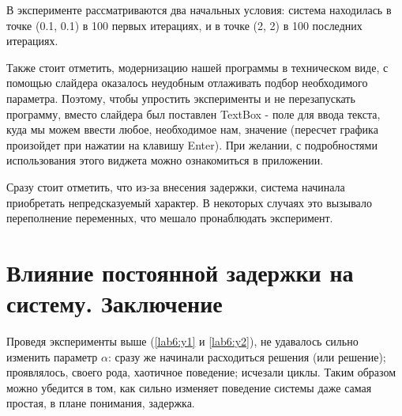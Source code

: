 В эксперименте рассматриваются два начальных условия: система находилась
в точке (0.1, 0.1) в 100 первых итерациях, и в точке (2, 2) в 100 последних итерациях.

Также стоит отметить, модернизацию нашей программы в техническом виде,
с помощью слайдера оказалось неудобным отлаживать подбор необходимого параметра.
Поэтому, чтобы упростить эксперименты и не перезапускать программу, вместо
слайдера был поставлен \textmd{TextBox} - поле для ввода текста, куда мы
можем ввести любое, необходимое нам, значение (пересчет графика произойдет при нажатии на клавишу
\textmd{Enter}). При желании, с подробностями использования этого виджета можно ознакомиться
в приложении.

\clearpage

Сразу стоит отметить, что из-за внесения задержки, система начинала приобретать
непредсказуемый характер. В некоторых случаях это вызывало переполнение переменных,
что мешало пронаблюдать эксперимент.


\clearpage
\section{Влияние постоянной задержки на систему. Заключение}

Проведя эксперименты выше (\ref{lab6:y1} и \ref{lab6:y2}),
не удавалось сильно изменить параметр $\alpha$: сразу же начинали расходиться
решения (или решение); проявлялось, своего рода, хаотичное поведение; исчезали циклы.
Таким образом можно убедится в том, как сильно изменяет поведение системы
даже самая простая, в плане понимания, задержка.

